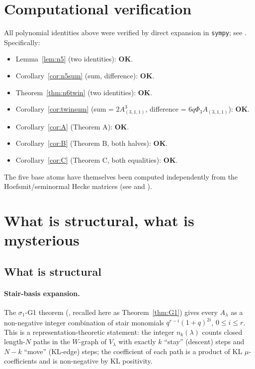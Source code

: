 \documentclass[11pt]{article}
\theoremstyle{plain}
\theoremstyle{definition}
\theoremstyle{remark}
\newcommand{\Vlam}{V_\lambda}
\newcommand{\PhiThree}{\Phi_3}
\begin{document}
\section{Computational verification}

All polynomial identities above were verified by direct expansion in
\texttt{sympy}; see
.  Specifically:
\begin{itemize}[leftmargin=2em]
\item Lemma~\ref{lem:n5} (two identities): \textbf{OK}.
\item Corollary~\ref{cor:n5sum} (sum, difference): \textbf{OK}.
\item Theorem~\ref{thm:n6twin} (two identities): \textbf{OK}.
\item Corollary~\ref{cor:twinsum} (sum = $2 A_{(3,1,1)}^3$, difference =
      $6q\PhiThree A_{(3,1,1)}$): \textbf{OK}.
\item Corollary~\ref{cor:A} (Theorem A): \textbf{OK}.
\item Corollary~\ref{cor:B} (Theorem B, both halves): \textbf{OK}.
\item Corollary~\ref{cor:C} (Theorem C, both equalities): \textbf{OK}.
\end{itemize}
The five base atoms have themselves been computed independently from the
Hoefsmit/seminormal Hecke matrices (see
and ).

\section{What is structural, what is mysterious}

\subsection{What is structural}

\paragraph{Stair-basis expansion.}
The $\sigma_1$-G1 theorem (\cite{Apr24}, recalled here as
Theorem~\ref{thm:G1}) gives every $A_\lambda$ as a non-negative integer
combination of stair monomials $q^{r-i}(1+q)^{2i}$, $0 \leq i \leq r$.  This is a
representation-theoretic statement: the integer $n_k(\lambda)$ counts closed
length-$N$ paths in the $W$-graph of $\Vlam$ with exactly $k$ ``stay''
(descent) steps and $N-k$ ``move'' (KL-edge) steps; the coefficient of each
path is a product of KL $\mu$-coefficients and is non-negative by KL positivity.
\end{document}
